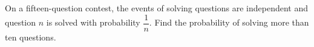 On a fifteen-question contest, the events of solving questions are independent and question $n$ is solved with probability $\dfrac{1}{n}$. Find the probability of solving more than ten questions.
